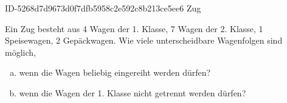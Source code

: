 \begin{exercise}
      {ID-5268d7d9673d0f7dfb5958c2e592c8b213ce5ee6}
      {Zug}
  \ifproblem\problem\par
    Ein Zug besteht aus 4 Wagen der 1. Klasse, 7 Wagen der 2. Klasse, 1
    Speisewagen, 2 Gepäckwagen. Wie viele unterscheidbare Wagenfolgen sind
    möglich,
    \begin{enumerate}[a)]
      \item wenn die Wagen beliebig eingereiht werden dürfen?
      \item wenn die Wagen der 1. Klasse nicht getrennt werden dürfen?
    \end{enumerate}
  \fi
\end{exercise}
